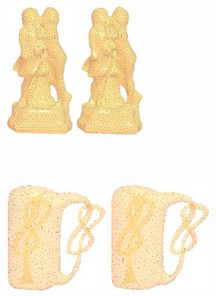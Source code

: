 \begin{figure}[htbp]
\includegraphics[width=0.2\textwidth]{figs/cvt/wireframe_Sculpture_LiuYang.png}
\includegraphics[width=0.2\textwidth]{figs/cvt/wireframe_Sculpture_Ours.png}\\
\\
   \\
\\
\includegraphics[width=0.3\textwidth]{figs/cvt/knot_GXH.png}
\includegraphics[width=0.3\textwidth]{figs/cvt/knot_OURS.png}\\

\end{figure}
